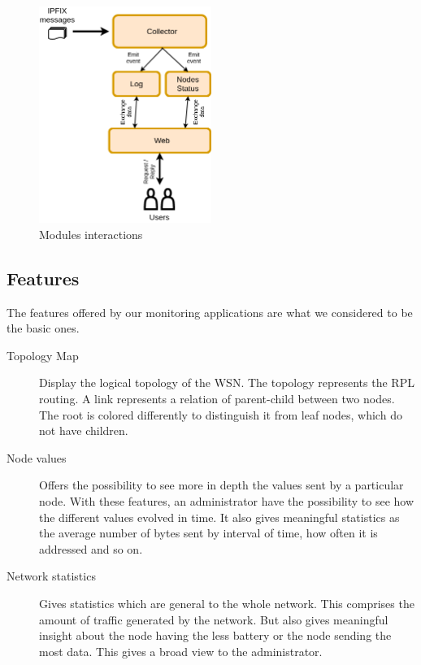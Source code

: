 \begin{figure}
	\centering
	\includegraphics[width=0.5\textwidth]{res/modules.png}
	\caption{Modules interactions}
	\label{fig:modules}
\end{figure}

\subsection{Features}

The features offered by our monitoring applications are what we considered to be the basic ones.

\begin{description}
	\item[Topology Map] Display the logical topology of the WSN. The topology represents the RPL routing. A link represents a relation of parent-child between two nodes. The root is colored differently to distinguish it from leaf nodes, which do not have children.
	\item[Node values] Offers the possibility to see more in depth the values sent by a particular node. With these features, an administrator have the possibility to see how the different values evolved in time. It also gives meaningful statistics as the average number of bytes sent by interval of time, how often it is addressed and so on.
	\item[Network statistics] Gives statistics which are general to the whole network. This comprises the amount of traffic generated by the network. But also gives meaningful insight about the node having the less battery or the node sending the most data. This gives a broad view to the administrator.
\end{description}

